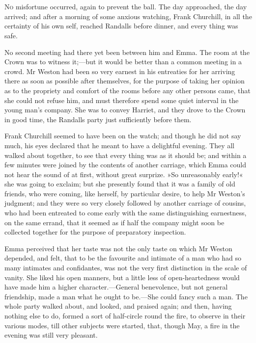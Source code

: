 \chapter[Chapter \thechapter]{}
	
\lettrine[lines=4,lraise=0.3]{N}{o} misfortune occurred, again to prevent the ball. The day approached, the day arrived; and after a morning of some anxious watching, Frank Churchill, in all the certainty of his own self, reached Randalls before dinner, and every thing was safe.

No second meeting had there yet been between him and Emma. The room at the Crown was to witness it;—but it would be better than a common meeting in a crowd. Mr Weston had been so very earnest in his entreaties for her arriving there as soon as possible after themselves, for the purpose of taking her opinion as to the propriety and comfort of the rooms before any other persons came, that she could not refuse him, and must therefore spend some quiet interval in the young man's company. She was to convey Harriet, and they drove to the Crown in good time, the Randalls party just sufficiently before them.

Frank Churchill seemed to have been on the watch; and though he did not say much, his eyes declared that he meant to have a delightful evening. They all walked about together, to see that every thing was as it should be; and within a few minutes were joined by the contents of another carriage, which Emma could not hear the sound of at first, without great surprize. »So unreasonably early!« she was going to exclaim; but she presently found that it was a family of old friends, who were coming, like herself, by particular desire, to help Mr Weston's judgment; and they were so very closely followed by another carriage of cousins, who had been entreated to come early with the same distinguishing earnestness, on the same errand, that it seemed as if half the company might soon be collected together for the purpose of preparatory inspection.

Emma perceived that her taste was not the only taste on which Mr Weston depended, and felt, that to be the favourite and intimate of a man who had so many intimates and confidantes, was not the very first distinction in the scale of vanity. She liked his open manners, but a little less of open-heartedness would have made him a higher character.—General benevolence, but not general friendship, made a man what he ought to be.—She could fancy such a man. The whole party walked about, and looked, and praised again; and then, having nothing else to do, formed a sort of half-circle round the fire, to observe in their various modes, till other subjects were started, that, though May, a fire in the evening was still very pleasant.

